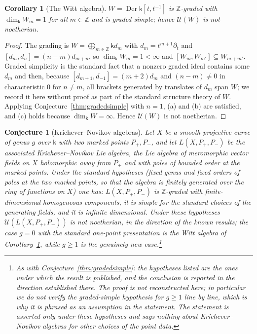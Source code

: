 \documentclass[11pt]{ctexart}
\theoremstyle{plain}
\newtheorem{corollary}[theorem]{Corollary}
\newtheorem{conjecture}[theorem]{Conjecture}
\theoremstyle{definition}
\theoremstyle{remark}
\newcommand{\kk}{\mathsf{k}}
\newcommand{\UU}{\mathcal{U}}
\newcommand{\Der}{\operatorname{Der}}
\begin{document}
\begin{corollary}[The Witt algebra]\label{cor:Wgraded}
$W=\Der\kk[t,t^{-1}]$ is $\mathbb{Z}$-graded with $\dim_\kk W_m=1$ for all
$m\in\mathbb{Z}$ and is graded simple; hence $\UU(W)$ is not noetherian.
\end{corollary}

\begin{proof}
The grading is $W=\bigoplus_{m\in\mathbb{Z}}\kk d_m$ with $d_m=t^{m+1}\partial_t$ and
$[d_m,d_n]=(n-m)d_{m+n}$, so $\dim_\kk W_m=1<\infty$ and
$[W_m,W_{m'}]\subseteq W_{m+m'}$. Graded simplicity is the standard fact that a
nonzero graded ideal contains some $d_m$ and then, because
$[d_{m+1},d_{-1}]=(m+2)d_m$ and $(n-m)\neq0$ in characteristic $0$ for $n\neq m$, all
brackets generated by translates of $d_m$ span $W$; we record it here without proof as
part of the standard structure theory of $W$. Applying
Conjecture~\ref{thm:gradedsimple} with $n=1$, (a) and (b) are satisfied, and (c) holds
because $\dim_\kk W=\infty$. Hence $\UU(W)$ is not noetherian.
\end{proof}

\begin{conjecture}[Krichever--Novikov algebras]\label{thm:kn}
Let $X$ be a smooth projective curve of genus $g$ over $\kk$ with two marked points
$P_+,P_-$, and let $L(X,P_+,P_-)$ be the associated Krichever--Novikov Lie algebra, the
Lie algebra of meromorphic vector fields on $X$ holomorphic away from $P_\pm$ and with
poles of bounded order at the marked points. Under the standard hypotheses
(fixed genus and fixed orders of poles at the two marked points, so that the algebra is
finitely generated over the ring of functions on $X$) one has: $L(X,P_+,P_-)$ is
$\mathbb{Z}$-graded with finite-dimensional homogeneous components, it is simple for
the standard choices of the generating fields, and it is infinite dimensional.
Under these hypotheses $\UU(L(X,P_+,P_-))$ is not noetherian, in the direction of the
known results; the case $g=0$ with the standard one-point presentation is the Witt
algebra of Corollary~\ref{cor:Wgraded}, while $g\ge1$ is the genuinely new case.\footnote{As with
Conjecture~\ref{thm:gradedsimple}: the hypotheses listed are the ones under which the
result is published, and the conclusion is reported in the direction established
there. The proof is not reconstructed here; in particular we do not verify the
graded-simple hypothesis for $g\ge1$ line by line, which is why it is phrased as an
assumption in the statement. The statement is asserted only under these hypotheses and
says nothing about Krichever--Novikov algebras for other choices of the point data.}
\end{conjecture}
\end{document}
